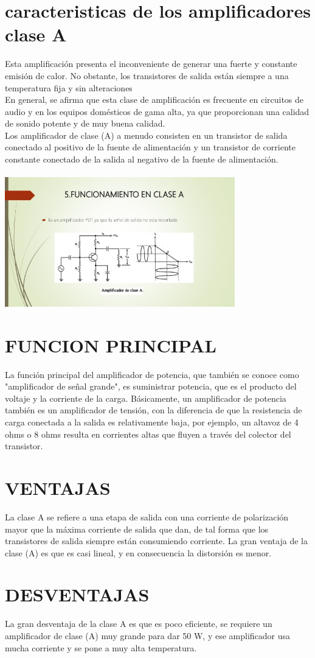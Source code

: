 \documentclass[12pt,a4paper]{article}
\begin{document}
\section{caracteristicas de los amplificadores clase A }
Esta amplificaci\'on presenta el inconveniente de generar una fuerte y constante emisi\'on de calor. No obstante, los transistores de salida est\'an siempre a una temperatura fija y sin alteraciones\\
En general, se afirma que esta clase de amplificaci\'on es frecuente en circuitos de audio y en los equipos dom\'esticos de gama alta, ya que proporcionan una calidad de sonido potente y de muy buena calidad.\\
Los amplificador de clase (A) a menudo consisten en un transistor de salida conectado al positivo de la fuente de alimentaci\'on y un transistor de corriente constante conectado de la salida al negativo de la fuente de alimentaci\'on.\\
\\
\includegraphics[width=10cm]{amplificadores-de-potencia-f-13-638.jpg}
\\
\section{FUNCION PRINCIPAL}La funci\'on principal del amplificador de potencia, que tambi\'en se conoce como "amplificador de se\~nal grande", es suministrar potencia, que es el producto del voltaje y la corriente de la carga. B\'asicamente, un amplificador de potencia tambi\'en es un amplificador de tensi\'on, con la diferencia de que la resistencia de carga conectada a la salida es relativamente baja, por ejemplo, un altavoz de 4 ohms o 8 ohms resulta en corrientes altas que fluyen a trav\'es del colector del transistor.

\section{VENTAJAS}
La clase A se refiere a una etapa de salida con una corriente de polarizaci\'on mayor que la m\'axima corriente de salida que dan, de tal forma que los transistores de salida siempre est\'an consumiendo corriente. La gran ventaja de la clase (A) es que es casi lineal, y en consecuencia la distorsi\'on es menor.\\
\section{DESVENTAJAS}
La gran desventaja de la clase A es que es poco eficiente, se requiere un amplificador de clase (A) muy grande para dar 50 W, y ese amplificador usa mucha corriente y se pone a muy alta temperatura.


 
 
\end{document}
